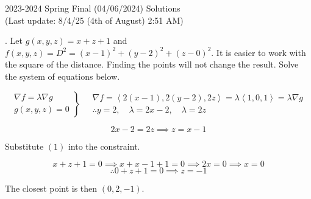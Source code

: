 \documentclass{article}
\begin{document}
\newpage

\begin{center}
2023-2024 Spring Final (04/06/2024) Solutions\\
(Last update: 8/4/25 (4th of August) 2:51 AM)
\end{center}

. Let $g(x,y,z)=x+z+1$ and $f(x,y,z)=D^2=(x-1)^2+(y-2)^2+(z-0)^2$. It is easier to work with the square of the distance. Finding the points will not change the result. Solve the system of equations below.

\[
\left.
\begin{array}{l}
\displaystyle\nabla f=\lambda\nabla g \\
\displaystyle g(x,y,z)=0
\end{array}
\right\}\quad
\begin{array}{l}
\nabla f=\left\langle2(x-1),2(y-2),2z\right\rangle=\lambda\left\langle1,0,1\right\rangle=\lambda\nabla g\\\therefore y=2, \quad\lambda=2x-2,\quad\lambda=2z
\end{array}
\]

\begin{equation}2x-2=2z\implies z=x-1\end{equation}

\hfill

\noindent Substitute $(1)$ into the constraint.

\[x+z+1=0\implies x+x-1+1=0\implies2x=0\implies x=0\]
\[\therefore 0+z+1=0\implies z=-1\]

\hfill

\noindent The closest point is then $\boxed{(0,2,-1)}$.

\hfill
\end{document}
